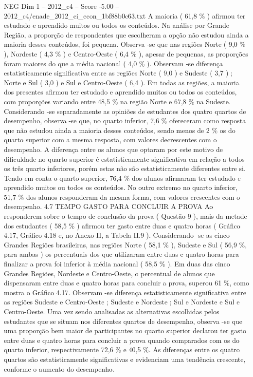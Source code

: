 \begin{textsample}{NEG Dim 1 – 2012\_c4 – Score -5.00 – 2012\_c4/enade\_2012\_ci\_econ\_1bf88b0c63.txt}
A maioria ( 61,8 \% ) afirmou ter estudado e aprendido muitos ou todos os conteúdos.
Na análise por Grande Região, a proporção de respondentes que escolheram a opção não estudou ainda a maioria desses conteúdos, foi pequena.
Observa -se que nas regiões Norte ( 9,0 \% ), Nordeste ( 4,3 \% ) e Centro-Oeste ( 6,4 \% ), apesar de pequenas, as proporções foram maiores do que a média nacional ( 4,0 \% ).
Observam -se diferença estatisticamente significativa entre as regiões Norte ( 9,0 ) e Sudeste ( 3,7 ) ; Norte e Sul ( 3,0 ) e Sul e Centro-Oeste ( 6,4 ).
Em todas as regiões, a maioria dos presentes afirmou ter estudado e aprendido muitos ou todos os conteúdos, com proporções variando entre 48,5 \% na região Norte e 67,8 \% na Sudeste.
Considerando -se separadamente as opiniões de estudantes dos quatro quartos de desempenho, observa -se que, no quarto inferior, 7,6 \% ofereceram como resposta que não estudou ainda a maioria desses conteúdos, sendo menos de 2 \% os do quarto superior com a mesma resposta, com valores decrescentes com o desempenho.
A diferença entre os alunos que optaram por este motivo de dificuldade no quarto superior é estatisticamente significativa em relação a todos os três quarto inferiores, porém estas não são estatisticamente diferentes entre si.
Tendo em conta o quarto superior, 76,4 \% dos alunos afirmaram ter estudado e aprendido muitos ou todos os conteúdos.
No outro extremo no quarto inferior, 51,7 \% dos alunos responderam da mesma forma, com valores crescentes com o desempenho. 4.7 TEMPO GASTO PARA CONCLUIR A PROVA Ao responderem sobre o tempo de conclusão da prova ( Questão 9 ), mais da metade dos estudantes ( 58,5 \% ) afirmou ter gasto entre duas e quatro horas ( Gráfico 4.17, Gráfico 4.18 e, no Anexo II, a Tabela II.9 ).
Considerando -se as cinco Grandes Regiões brasileiras, nas regiões Norte ( 58,1 \% ), Sudeste e Sul ( 56,9 \%, para ambas ) os percentuais dos que utilizaram entre duas e quatro horas para finalizar a prova foi inferior à média nacional ( 58,5 \% ).
Em duas das cinco Grandes Regiões, Nordeste e Centro-Oeste, o percentual de alunos que dispensaram entre duas e quatro horas para concluir a prova, superou 61 \%, como mostra o Gráfico 4.17.
Observam -se diferença estatisticamente significativa entre as regiões Sudeste e Centro-Oeste ; Sudeste e Nordeste ; Sul e Nordeste e Sul e Centro-Oeste.
Uma vez sendo analisadas as alternativas escolhidas pelos estudantes que se situam nos diferentes quartos de desempenho, observa -se que uma proporção bem maior de participantes no quarto superior declarou ter gasto entre duas e quatro horas para concluir a prova quando comparados com os do quarto inferior, respectivamente 72,6 \% e 40,5 \%.
As diferenças entre os quatro quartos são estatisticamente significativas e evidenciam uma tendência crescente, conforme o aumento do desempenho.

\end{textsample}
